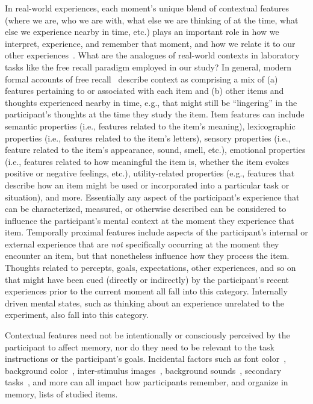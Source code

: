 \documentclass[11pt]{article}
\begin{document}
In real-world experiences, each moment's unique blend of contextual features
(where we are, who we are with, what else we are thinking of at the time, what
else we experience nearby in time, etc.) plays an important role in how we
interpret, experience, and remember that moment, and how we relate it to our
other experiences~\citep[e.g., for review see ][]{Mann20}. What are the
analogues of real-world contexts in laboratory tasks like the free recall
paradigm employed in our study? In general, modern formal accounts of free
recall~\citep{Kaha20} describe context as comprising a mix of (a) features
pertaining to or associated with each item and (b) other items and thoughts
experienced nearby in time, e.g., that might still be ``lingering'' in the
participant's thoughts at the time they study the item. Item features can
include semantic properties (i.e., features related to the item's meaning),
lexicographic properties (i.e., features related to the item's letters),
sensory properties (i.e., feature related to the item's appearance, sound,
smell, etc.), emotional properties (i.e., features related to how meaningful
the item is, whether the item evokes positive or negative feelings, etc.),
utility-related properties (e.g., features that describe how an item might be
used or incorporated into a particular task or situation), and more.
Essentially any aspect of the participant's experience that can be
characterized, measured, or otherwise described can be considered to influence
the participant's mental context at the moment they experience that item.
Temporally proximal features include aspects of the participant's internal or
external experience that are \textit{not} specifically occurring at the moment
they encounter an item, but that nonetheless influence how they process the
item. Thoughts related to percepts, goals, expectations, other experiences, and
so on that might have been cued (directly or indirectly) by the participant's
recent experiences prior to the current moment all fall into this category.
Internally driven mental states, such as thinking about an experience unrelated
to the experiment, also fall into this category.

Contextual features need not be intentionally or consciously perceived by the
participant to affect memory, nor do they need to be relevant to the task
instructions or the participant's goals. Incidental factors such as font
color~\citep{JonePyc14}, background color~\citep{IsarIsar07}, inter-stimulus
images~\citep{GersEtal13, MannEtal16, ChiuEtal21}, background
sounds~\citep{BeamJone98, SahaSmit14}, secondary tasks~\citep{MasiSaha14,
PolyEtal09, OberLewa08}, and more can all impact how participants remember, and
organize in memory, lists of studied items.
\end{document}
